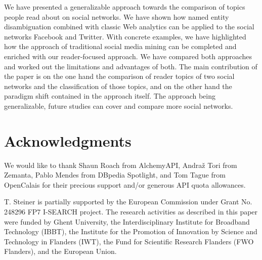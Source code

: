 \documentclass{iosart2c}
\begin{document}
We have presented a generalizable approach towards the comparison of topics people read about on social networks.
We have shown how named entity disambiguation combined with classic Web analytics can be applied to the social networks Facebook and Twitter.
With concrete examples, we have highlighted how the approach of traditional social media mining can be completed and enriched with our reader-focused approach.
We have compared both approaches and worked out the limitations and advantages of both.
The main contribution of the paper is on the one hand the comparison of reader topics of two social networks and the classification of those topics, and on the other hand the paradigm shift contained in the approach itself.
The approach being generalizable, future studies can cover and compare more social networks.

\section*{Acknowledgments}
We would like to thank Shaun Roach from AlchemyAPI, Andraž Tori from Zemanta, Pablo Mendes from DBpedia Spotlight, and Tom Tague from OpenCalais for their precious support and/or generous API quota allowances. 

T. Steiner is partially supported by the European Commission under Grant No. 248296 FP7 I-SEARCH project.
The research activities as described in this paper were funded by Ghent University, the Interdisciplinary Institute for Broadband Technology (IBBT), the Institute for the Promotion of Innovation by Science and Technology in Flanders (IWT), the Fund for Scientific Research Flanders (FWO Flanders), and the European Union.



\end{document}
